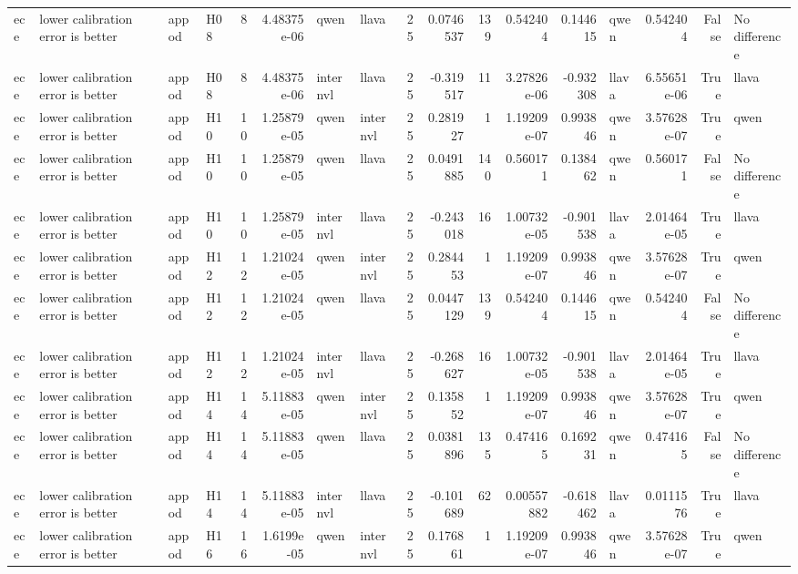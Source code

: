 \begin{longtable}{llllrrllrrrrrlrrl}
ece & lower calibration error is better & appod & H08 & 8 & 4.48375e-06 & qwen & llava & 25 & 0.0746537 & 139 & 0.542404 & 0.144615 & qwen & 0.542404 & False & No difference \\
ece & lower calibration error is better & appod & H08 & 8 & 4.48375e-06 & internvl & llava & 25 & -0.319517 & 11 & 3.27826e-06 & -0.932308 & llava & 6.55651e-06 & True & llava \\
ece & lower calibration error is better & appod & H10 & 10 & 1.25879e-05 & qwen & internvl & 25 & 0.281927 & 1 & 1.19209e-07 & 0.993846 & qwen & 3.57628e-07 & True & qwen \\
ece & lower calibration error is better & appod & H10 & 10 & 1.25879e-05 & qwen & llava & 25 & 0.0491885 & 140 & 0.560171 & 0.138462 & qwen & 0.560171 & False & No difference \\
ece & lower calibration error is better & appod & H10 & 10 & 1.25879e-05 & internvl & llava & 25 & -0.243018 & 16 & 1.00732e-05 & -0.901538 & llava & 2.01464e-05 & True & llava \\
ece & lower calibration error is better & appod & H12 & 12 & 1.21024e-05 & qwen & internvl & 25 & 0.284453 & 1 & 1.19209e-07 & 0.993846 & qwen & 3.57628e-07 & True & qwen \\
ece & lower calibration error is better & appod & H12 & 12 & 1.21024e-05 & qwen & llava & 25 & 0.0447129 & 139 & 0.542404 & 0.144615 & qwen & 0.542404 & False & No difference \\
ece & lower calibration error is better & appod & H12 & 12 & 1.21024e-05 & internvl & llava & 25 & -0.268627 & 16 & 1.00732e-05 & -0.901538 & llava & 2.01464e-05 & True & llava \\
ece & lower calibration error is better & appod & H14 & 14 & 5.11883e-05 & qwen & internvl & 25 & 0.135852 & 1 & 1.19209e-07 & 0.993846 & qwen & 3.57628e-07 & True & qwen \\
ece & lower calibration error is better & appod & H14 & 14 & 5.11883e-05 & qwen & llava & 25 & 0.0381896 & 135 & 0.474165 & 0.169231 & qwen & 0.474165 & False & No difference \\
ece & lower calibration error is better & appod & H14 & 14 & 5.11883e-05 & internvl & llava & 25 & -0.101689 & 62 & 0.00557882 & -0.618462 & llava & 0.0111576 & True & llava \\
ece & lower calibration error is better & appod & H16 & 16 & 1.6199e-05 & qwen & internvl & 25 & 0.176861 & 1 & 1.19209e-07 & 0.993846 & qwen & 3.57628e-07 & True & qwen \\

\end{longtable}
